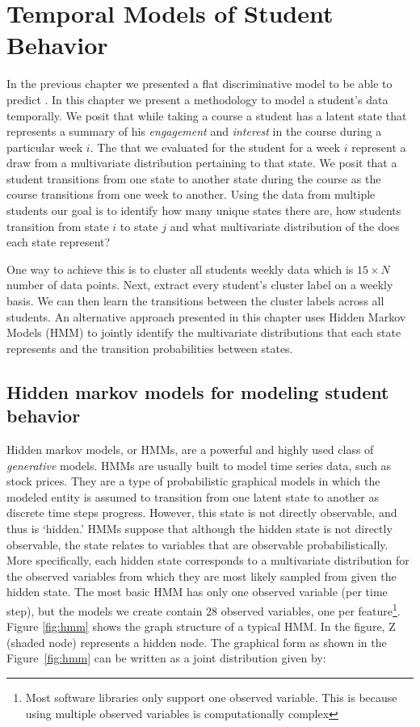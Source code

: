 \chapter{Temporal Models of Student Behavior}\label{chap:hmm} 

In the previous chapter we presented a flat discriminative model to be able to predict \sti. In this chapter we present a methodology to model a student's data temporally. We posit that while taking a course a student has a latent state that represents a summary of his \textit{engagement} and \textit{interest} in the course during a particular week $i$. The \feat that we evaluated for the student for a week $i$ represent a draw from a multivariate distribution pertaining to that state. We posit that a student transitions from one state to another state during the course as the course transitions from one week to another. Using the data from multiple students our goal is to identify how many unique states there are, how students transition from state $i$ to state $j$ and what multivariate distribution of the \feat does each state represent? 

One way to achieve this is to cluster all students weekly data which is $15 \times N$ number of data points. Next, extract every student's cluster label on a weekly basis. We can then learn the transitions between the cluster labels across all students. An alternative approach presented in this chapter uses Hidden Markov Models (HMM) to jointly identify the multivariate distributions that each state represents and the transition probabilities between states.  

\section{Hidden markov models for modeling student behavior}
Hidden markov models, or HMMs, are a powerful and highly used class of \textit{generative} models. HMMs are usually built to model time series data, such as stock prices. They are a type of probabilistic graphical models in which the modeled entity is assumed to transition from one latent state to another as discrete time steps progress.  However, this state is not directly observable, and thus is `hidden.'  HMMs suppose that although the hidden state is not directly observable, the state relates to variables that are observable probabilistically. More specifically, each hidden state corresponds to a multivariate distribution for the observed variables from which they are most likely sampled from given the hidden state. The most basic HMM has only one observed variable (per time step), but the models we create contain 28 observed variables, one per feature\footnote{Most software libraries only support one observed variable. This is because using multiple observed variables is computationally complex}. Figure \ref{fig:hmm} shows the graph structure of a typical HMM. In the figure, Z (shaded node) represents a hidden node. The graphical form as shown in the Figure~\ref{fig:hmm} can be written as a joint distribution given by: 

